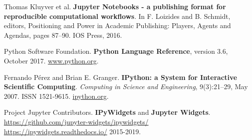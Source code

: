 \documentclass[runningheads]{llncs}
\begin{document}
%
%
% 
% 
%
\begin{thebibliography}{8}
    Thomas Kluyver et al.
    \textbf{Jupyter Notebooks - a publishing format for reproducible computational workflows}.
    In F. Loizides and B. Schmidt, editors, Positioning and Power in Academic Publishing: Players, Agents and Agendas, pages 87–90. IOS Press, 2016.

    Python Software Foundation.
    \textbf{Python Language Reference}, version 3.6, October 2017. \url{www.python.org}.

    Fernando Pérez and Brian E. Granger.
    \textbf{IPython: a System for Interactive Scientific Computing}.
    \emph{Computing in Science and Engineering}, 9(3):21–29, May 2007. ISSN 1521-9615. \url{ipython.org}.

    Project Jupyter Contributors.
    \textbf{IPyWidgets} and \textbf{Jupyter Widgets}.
    \url{https://github.com/jupyter-widgets/ipywidgets/}
    \url{https://ipywidgets.readthedocs.io/}
    2015-2019.
\end{thebibliography}
\end{document}
